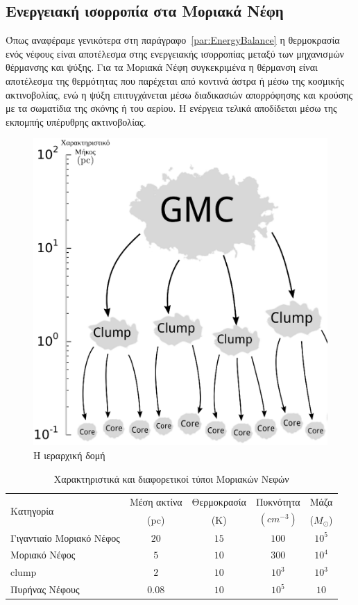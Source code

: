 \documentclass[a4paper,12pt]{memoir}
\newcommand{\sm}{$M_{\odot}$}
\begin{document}
\subsection{Ενεργειακή ισορροπία στα Μοριακά Νέφη}
Όπως αναφέραμε γενικότερα στη παράγραφο~\ref{par:EnergyBalance} η θερμοκρασία ενός νέφους είναι αποτέλεσμα στης ενεργειακής ισορροπίας μεταξύ των μηχανισμών θέρμανσης και ψύξης. Για τα Μοριακά Νέφη συγκεκριμένα η θέρμανση είναι αποτέλεσμα της θερμότητας που παρέχεται από κοντινά άστρα ή μέσω της κοσμικής ακτινοβολίας, ενώ η ψύξη επιτυγχάνεται μέσω διαδικασιών απορρόφησης και κρούσης με τα σωματίδια της σκόνης ή του αερίου.
Η ενέργεια τελικά αποδίδεται μέσω της εκπομπής υπέρυθρης ακτινοβολίας.

%
\begin{figure}[hb]
	\centering
	\includegraphics[width=15cm]{images/fragmentation.ps}
	\caption{Η ιεραρχική δομή}
\end{figure}

\begin{table}
	\caption{Χαρακτηριστικά και διαφορετικοί τύποι Μοριακών Νεφών}
	\label{tab:MCtypes}
	\begin{tabular}{l c c c c}
		\toprule
		\multirow{2}{*}{Κατηγορία} & Μέση ακτίνα &  Θερμοκρασία & Πυκνότητα \ce{H2} & Μάζα \\ 
		& (pc) & (K) & $(cm^{-3})$ & (\sm) \\
		\midrule
		Γιγαντιαίο Μοριακό Νέφος & $20$ & $15$ & $100$ & $10^5$ \\
		Μοριακό Νέφος & $5$ & $10$ & $300$ & $10^4$\\
		clump & $2$ & $10$ & $10^3$ & $10^3$\\
		Πυρήνας Νέφους & $0.08$ & $10$ & $10^5$ & $10$\\
		\bottomrule
	\end{tabular}
\end{table}
\end{document}
